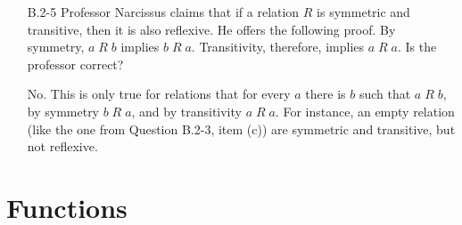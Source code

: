 \begin{enumerate}
\item[B.2{-}5]{Professor Narcissus claims that if a relation $R$ is symmetric
and transitive, then it is also reflexive. He offers the following proof. By
symmetry, $a\;R\;b$ implies $b\;R\;a$. Transitivity, therefore, implies
$a\;R\;a$. Is the professor correct?}

\begin{framed}
No. This is only true for relations that for every $a$ there is $b$ such that
$a\;R\;b$, by symmetry $b\;R\;a$, and by transitivity $a\;R\;a$. For
instance, an empty relation (like the one from Question B.2-3, item (c)) are
symmetric and transitive, but not reflexive.
\end{framed}

\end{enumerate}

\newpage

\section{Functions}

